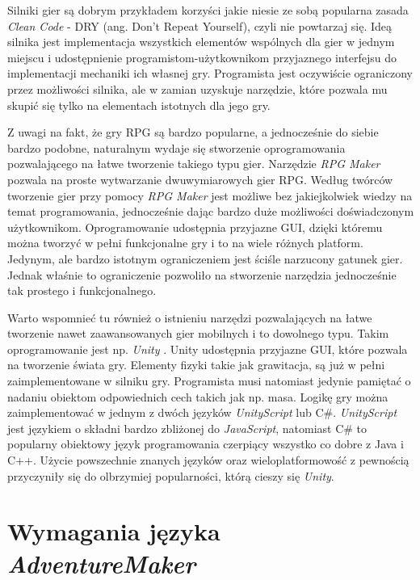 \documentclass[openright]{xmgr}
\begin{document}
Silniki gier są dobrym przykładem korzyści jakie niesie ze sobą popularna zasada \textit{Clean Code} \cite{CleanCode:2005} - DRY (ang. Don't Repeat Yourself), czyli nie powtarzaj się. Ideą silnika jest implementacja wszystkich elementów wspólnych dla gier w jednym miejscu i udostępnienie programistom-użytkownikom przyjaznego interfejsu do implementacji mechaniki ich własnej gry. Programista jest oczywiście ograniczony przez możliwości silnika, ale w zamian uzyskuje narzędzie, które pozwala mu skupić się tylko na elementach istotnych dla jego gry.

Z uwagi na fakt, że gry RPG są bardzo popularne, a jednocześnie do siebie bardzo podobne, naturalnym wydaje się stworzenie oprogramowania pozwalającego na łatwe tworzenie takiego typu gier. Narzędzie \textit{RPG Maker} \cite{RPGMaker:2017:Doc} pozwala na proste wytwarzanie dwuwymiarowych gier RPG. Według twórców tworzenie gier przy pomocy \textit{RPG Maker} jest możliwe bez jakiejkolwiek wiedzy na temat programowania, jednocześnie dając bardzo duże możliwości doświadczonym użytkownikom. Oprogramowanie udostępnia przyjazne GUI, dzięki któremu można tworzyć w pełni funkcjonalne gry i to na wiele różnych platform. Jedynym, ale bardzo istotnym ograniczeniem jest ściśle narzucony gatunek gier. Jednak właśnie to ograniczenie pozwoliło na stworzenie narzędzia jednocześnie tak prostego i funkcjonalnego. 

Warto wspomnieć tu również o istnieniu narzędzi pozwalających na łatwe tworzenie nawet zaawansowanych gier mobilnych i to dowolnego typu. Takim oprogramowanie jest np. \textit{Unity} \cite{Unity3D:2017:Doc}. Unity udostępnia przyjazne GUI, które pozwala na tworzenie świata gry. Elementy fizyki takie jak grawitacja, są już w pełni zaimplementowane w silniku gry. Programista musi natomiast jedynie pamiętać o nadaniu obiektom odpowiednich cech takich jak np. masa. Logikę gry można zaimplementować w jednym z dwóch języków \textit{UnityScript} lub C\#. \textit{UnityScript} jest językiem o składni bardzo zbliżonej do \textit{JavaScript}, natomiast C\# to popularny obiektowy język programowania czerpiący wszystko co dobre z Java i C++. Użycie powszechnie znanych języków oraz wieloplatformowość z pewnością przyczyniły się do olbrzymiej popularności, którą cieszy się \textit{Unity}.


\chapter{Wymagania języka \textit{AdventureMaker}}
\end{document}
